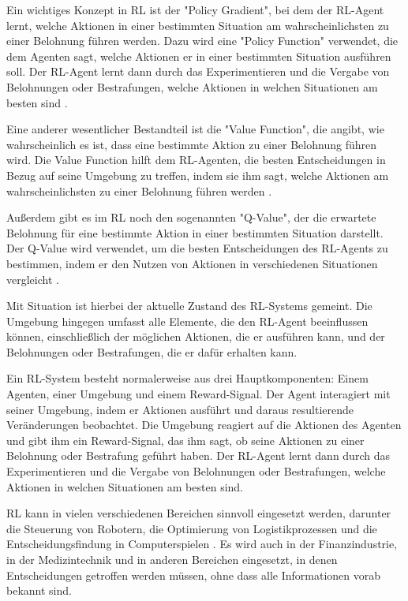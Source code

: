 \documentclass[oneside,bibliography=totocnumbered,BCOR=5mm]{scrbook}%
\theoremstyle{definition}
\theoremstyle{definition}
\theoremstyle{definition}
\theoremstyle{definition}
\theoremstyle{definition}
\theoremstyle{definition}
\begin{document}
Ein wichtiges Konzept in RL ist der "Policy Gradient", bei dem der RL-Agent lernt, 
welche Aktionen in einer bestimmten Situation am wahrscheinlichsten zu einer Belohnung führen werden. 
Dazu wird eine "Policy Function" verwendet, die dem Agenten sagt, welche Aktionen er in einer bestimmten Situation ausführen soll. 
Der RL-Agent lernt dann durch das Experimentieren und die Vergabe von Belohnungen oder Bestrafungen, 
welche Aktionen in welchen Situationen am besten sind \autocite[Seite 5]{deepRL}.


Eine anderer wesentlicher Bestandteil ist die "Value Function", 
die angibt, wie wahrscheinlich es ist, dass eine bestimmte Aktion zu einer Belohnung führen wird. 
Die Value Function hilft dem RL-Agenten, die besten Entscheidungen in Bezug auf seine Umgebung zu treffen, 
indem sie ihm sagt, welche Aktionen am wahrscheinlichsten zu einer Belohnung führen werden \autocite[Seite 6]{deepRL}.


Außerdem gibt es im RL noch den sogenannten "Q-Value", der die erwartete Belohnung für eine 
bestimmte Aktion in einer bestimmten Situation darstellt. 
Der Q-Value wird verwendet, um die besten Entscheidungen des RL-Agents zu bestimmen, 
indem er den Nutzen von Aktionen in verschiedenen Situationen vergleicht \autocite[Seite 4]{deepRL}.


Mit Situation ist hierbei der aktuelle Zustand des RL-Systems gemeint. 
Die Umgebung hingegen umfasst alle Elemente, die den RL-Agent beeinflussen können, 
einschließlich der möglichen Aktionen, die er ausführen kann, und der Belohnungen oder Bestrafungen, 
die er dafür erhalten kann.


Ein RL-System besteht normalerweise aus drei Hauptkomponenten: 
Einem Agenten, einer Umgebung und einem Reward-Signal. Der Agent interagiert mit seiner Umgebung, 
indem er Aktionen ausführt und daraus resultierende Veränderungen beobachtet. 
Die Umgebung reagiert auf die Aktionen des Agenten und gibt ihm ein Reward-Signal, 
das ihm sagt, ob seine Aktionen zu einer Belohnung oder Bestrafung geführt haben. 
Der RL-Agent lernt dann durch das Experimentieren und die Vergabe von Belohnungen oder Bestrafungen, 
welche Aktionen in welchen Situationen am besten sind.


RL kann in vielen verschiedenen Bereichen sinnvoll eingesetzt werden, darunter die Steuerung von Robotern, 
die Optimierung von Logistikprozessen und die Entscheidungsfindung in Computerspielen \autocite[Seite 1]{deepRL}. 
Es wird auch in der Finanzindustrie, in der Medizintechnik und in anderen Bereichen eingesetzt, 
in denen Entscheidungen getroffen werden müssen, ohne dass alle Informationen vorab bekannt sind.
\end{document}
